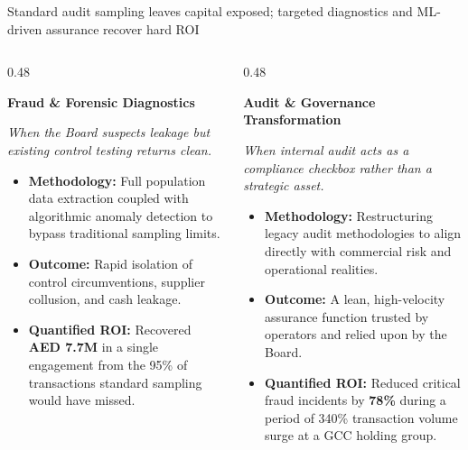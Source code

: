 \documentclass[aspectratio=169, 10pt]{beamer}
\begin{document}
\begin{frame}{Standard audit sampling leaves capital exposed; targeted diagnostics and ML-driven assurance recover hard ROI}
    \vspace{0.3cm}
    \begin{columns}[T]
        \begin{column}{0.48\textwidth}
            \begin{tcolorbox}[colback=bcgLightGray, colframe=bcgLightGray, arc=0pt, left=5pt, top=5pt, bottom=5pt]
                \textbf{\large \color{bcgGreen} Fraud \& Forensic Diagnostics}
            \end{tcolorbox}
            \textit{\color{gray} When the Board suspects leakage but existing control testing returns clean.}
            \vspace{0.2cm}
            \begin{itemize}
                \item \textbf{Methodology:} Full population data extraction coupled with algorithmic anomaly detection to bypass traditional sampling limits.
                \item \textbf{Outcome:} Rapid isolation of control circumventions, supplier collusion, and cash leakage.
                \item \textbf{\color{bcgGreen} Quantified ROI:} Recovered \textbf{AED 7.7M} in a single engagement from the 95\% of transactions standard sampling would have missed.
            \end{itemize}
        \end{column}
        
        \begin{column}{0.48\textwidth}
            \begin{tcolorbox}[colback=bcgLightGray, colframe=bcgLightGray, arc=0pt, left=5pt, top=5pt, bottom=5pt]
                \textbf{\large \color{bcgGreen} Audit \& Governance Transformation}
            \end{tcolorbox}
            \textit{\color{gray} When internal audit acts as a compliance checkbox rather than a strategic asset.}
            \vspace{0.2cm}
            \begin{itemize}
                \item \textbf{Methodology:} Restructuring legacy audit methodologies to align directly with commercial risk and operational realities.
                \item \textbf{Outcome:} A lean, high-velocity assurance function trusted by operators and relied upon by the Board.
                \item \textbf{\color{bcgGreen} Quantified ROI:} Reduced critical fraud incidents by \textbf{78\%} during a period of 340\% transaction volume surge at a GCC holding group.
            \end{itemize}
        \end{column}
    \end{columns}
\end{frame}
\end{document}
